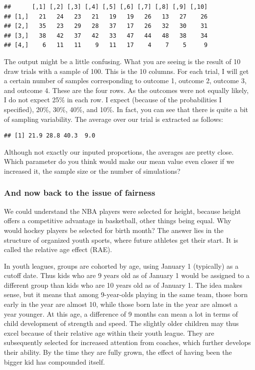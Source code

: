 \documentclass[
  openany]{book}
\begin{document}
\begin{verbatim}
##      [,1] [,2] [,3] [,4] [,5] [,6] [,7] [,8] [,9] [,10]
## [1,]   21   24   23   21   19   19   26   13   27    26
## [2,]   35   23   29   28   37   17   26   32   30    31
## [3,]   38   42   37   42   33   47   44   48   38    34
## [4,]    6   11   11    9   11   17    4    7    5     9
\end{verbatim}

The output might be a little confusing. What you are seeing is the result of 10 draw trials with a sample of 100. This is the 10 columns. For each trial, I will get a certain number of samples corresponding to outcome 1, outcome 2, outcome 3, and outcome 4. These are the four rows. As the outcomes were not equally likely, I do not expect 25\% in each row. I expect (because of the probabilities I specified), 20\%, 30\%, 40\%, and 10\%. In fact, you can see that there is quite a bit of sampling variability. The average over our trial is extracted as follows:

\begin{verbatim}
## [1] 21.9 28.8 40.3  9.0
\end{verbatim}

Although not exactly our inputed proportions, the averages are pretty close. Which parameter do you think would make our mean value even closer if we increased it, the sample size or the number of simulations?

\hypertarget{and-now-back-to-the-issue-of-fairness}{%
\subsubsection*{And now back to the issue of fairness}\label{and-now-back-to-the-issue-of-fairness}}

We could understand the NBA players were selected for height, because height offers a competitive advantage in basketball, other things being equal. Why would hockey players be selected for birth month? The answer lies in the structure of organized youth sports, where future athletes get their start. It is called the relative age effect (RAE).

In youth leagues, groups are cohorted by age, using January 1 (typically) as a cutoff date. Thus kids who are 9 years old as of January 1 would be assigned to a different group than kids who are 10 years old as of January 1. The idea makes sense, but it means that among 9-year-olds playing in the same team, those born early in the year are almost 10, while those born late in the year are almost a year younger. At this age, a difference of 9 months can mean a lot in terms of child development of strength and speed. The slightly older children may thus excel because of their relative age within their youth league. They are subsequently selected for increased attention from coaches, which further develops their ability. By the time they are fully grown, the effect of having been the bigger kid has compounded itself.
\end{document}
